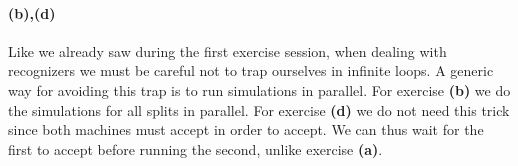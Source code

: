 \documentclass{article}
\begin{document}
\paragraph{(b),(d)}
Like we already saw during the first exercise session, when dealing with
recognizers we must be careful not to trap ourselves in infinite loops. A
generic way for avoiding this trap is to run simulations in parallel. For
exercise \textbf{(b)} we do the simulations for all splits in
parallel. For exercise \textbf{(d)} we do not need this trick since both
machines must accept in order to accept. We can thus wait for the first to
accept before running the second, unlike exercise \textbf{(a)}.
\end{document}
